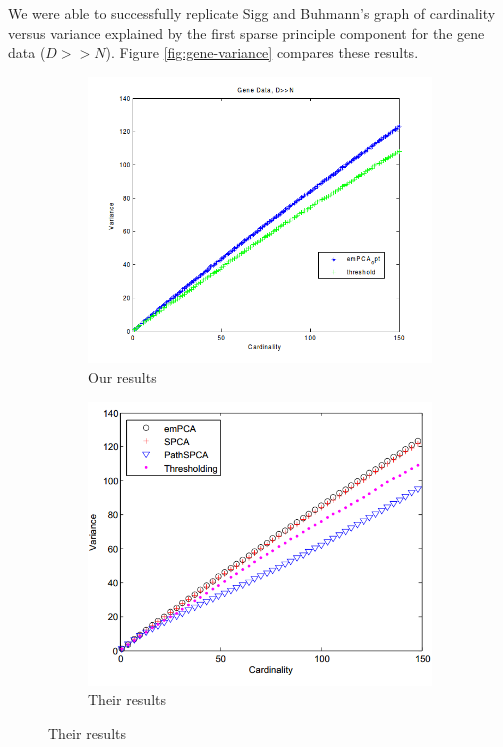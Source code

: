 \documentclass{article}
\begin{document}
We were able to successfully replicate Sigg and Buhmann's graph of
cardinality versus variance explained by the first sparse
principle component for the gene data ($D >> N$).
Figure \ref{fig:gene-variance} compares these results.

\begin{figure}[h,width=\textwidth]
\caption{Variance versus cardinality for gene data}
\label{fig:gene-variance}
\begin{subfigure}{0.5\textwidth}
\caption{Our results}
\includegraphics[width=\textwidth]{2.png}
\end{subfigure}
\begin{subfigure}{0.5\textwidth}
\caption{Their results}
\includegraphics[width=\textwidth]{1.png}
\end{subfigure}
\end{figure}
\end{document}
